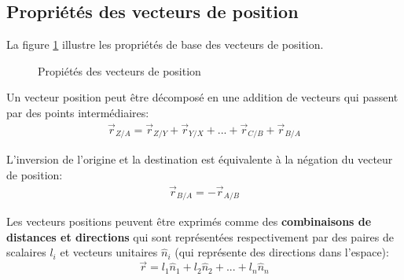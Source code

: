\subsection{Propriétés des vecteurs de position}
\label{sec:vecposprop}
%
La figure \ref{fig:vecposprop} illustre les propriétés de base des vecteurs de position.
%
\begin{figure}[htbp]
        \centering
				\hspace{5pt}
				\hspace{5pt}
        \caption{Propiétés des vecteurs de position}
				\label{fig:vecposprop}
\end{figure}
%
\begin{property}[Addition]
%
Un vecteur position peut être décomposé en une addition de vecteurs qui passent par des points intermédiaires:
\begin{align}
\vec{r}_{Z/A}  =   \vec{r}_{Z/Y} + \vec{r}_{Y/X} + ... + \vec{r}_{C/B} + \vec{r}_{B/A} 
\end{align} 
\end{property}
%
\begin{property}[Inversion]
%
L'inversion de l'origine et la destination est équivalente à la négation du vecteur de position:
\begin{align}
\vec{r}_{B/A}  = - \vec{r}_{A/B}
\end{align} 
\end{property}
%
\begin{property}
%
Les vecteurs positions peuvent être exprimés comme des \textbf{combinaisons de distances et directions} qui sont représentées respectivement par des paires de scalaires $l_i$ et vecteurs unitaires $\hat{n}_i$ (qui représente des directions dans l'espace):
\begin{equation}
\vec{r} = l_1 \hat{n}_1 + l_2 \hat{n}_2 + ... + l_n \hat{n}_n
\end{equation} 
\end{property}



